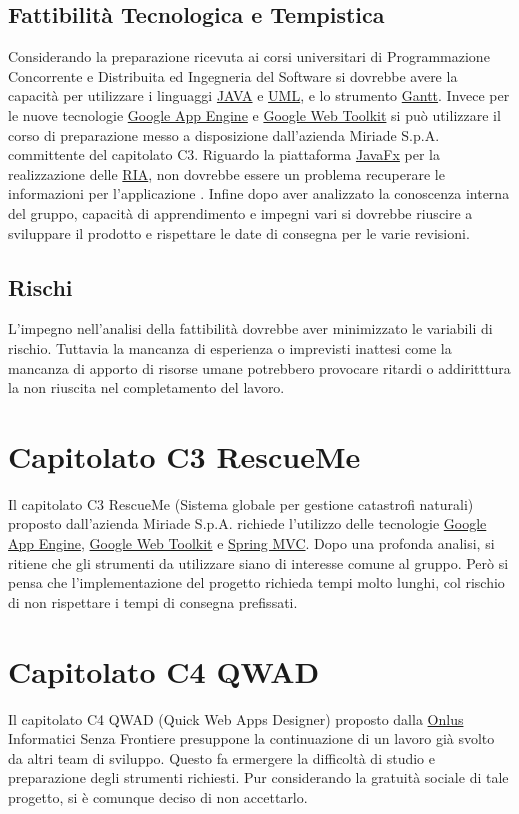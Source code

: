\section{Fattibilit\`a Tecnologica e Tempistica}
Considerando la preparazione ricevuta ai corsi universitari di Programmazione
Concorrente e Distribuita ed Ingegneria del Software si dovrebbe avere la
capacit\`a per utilizzare i linguaggi \underline{JAVA} e \underline{UML}, e lo
strumento \underline{Gantt}. Invece per le nuove tecnologie \underline{Google
App Engine} e \underline{Google Web Toolkit} si pu\`o utilizzare il corso di
preparazione messo a disposizione dall'azienda Miriade S.p.A. committente del
capitolato C3. Riguardo la piattaforma \underline{JavaFx} per la realizzazione
delle \underline{RIA}, non dovrebbe essere un problema recuperare le
informazioni per l'applicazione . Infine dopo aver analizzato la conoscenza interna del gruppo, capacit\`a di apprendimento e impegni vari si dovrebbe riuscire a sviluppare il prodotto e rispettare le date di consegna per le varie revisioni.
\section{Rischi}
L'impegno nell'analisi della fattibilit\`a dovrebbe aver minimizzato le variabili di rischio.
Tuttavia la mancanza di esperienza o imprevisti inattesi come la mancanza di apporto di risorse umane potrebbero provocare ritardi o addiritttura la non riuscita nel completamento del lavoro.

\chapter{Capitolato C3 RescueMe}
Il capitolato C3 RescueMe (Sistema globale per gestione catastrofi naturali)
proposto dall'azienda Miriade S.p.A. richiede l'utilizzo delle tecnologie
\underline{Google App Engine}, \underline{Google Web Toolkit} e
\underline{Spring MVC}. Dopo una profonda analisi, si ritiene che gli strumenti
da utilizzare siano di interesse comune al gruppo. Per\`o si pensa che l'implementazione del progetto richieda tempi molto lunghi, col rischio di non rispettare i tempi di consegna prefissati.

\chapter{Capitolato C4 QWAD}
Il capitolato C4 QWAD (Quick Web Apps Designer) proposto dalla \underline{Onlus}
Informatici Senza Frontiere presuppone la continuazione di un lavoro gi\`a svolto da altri
team di sviluppo. Questo fa ermergere la difficolt\`a di studio e preparazione degli strumenti richiesti. Pur considerando la gratuit\`a sociale di tale progetto, si \`e comunque deciso di non accettarlo.

